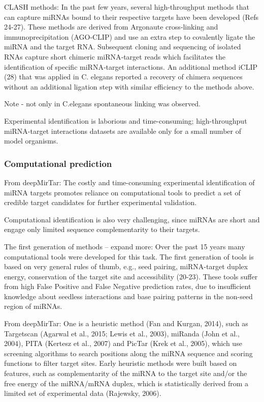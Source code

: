 \documentclass{bmcart}
\begin{document}
CLASH methods:
In the past few years, several high-throughput methods that can capture miRNAs bound to their respective targets have been developed (Refs 24-27). These methods are derived from Argonaute cross‐linking and immunoprecipitation (AGO‐CLIP) and use an extra step to covalently ligate the miRNA and the target RNA. Subsequent cloning and sequencing of isolated RNAs capture short chimeric miRNA‐target reads which facilitates the identification of specific miRNA‐target interactions. An additional method iCLIP (28) that was applied in C. elegans reported a recovery of chimera sequences without an additional ligation step with similar efficiency to the methods above.

Note - not only in C.elegans spontaneous linking was observed.

 Experimental identification is laborious and time-consuming; high-throughput miRNA-target interactions datasets are available only for a small number of model organisms. 

\subsubsection*{Computational prediction}

From deepMirTar: 
The costly and time-consuming experimental identification of
miRNA targets promotes reliance on computational tools to predict
a set of credible target candidates for further experimental validation.

Computational identification is also very challenging, since miRNAs are short and engage only limited sequence complementarity to their targets. 

The first generation of methods -- expand more:
Over the past 15 years many computational tools were developed for this task. The first generation of tools is based on very general rules of thumb, e.g., seed pairing, miRNA-target duplex energy, conservation of the target site and accessibility (20-23). These tools suffer from high False Positive and False Negative prediction rates, due to insufficient knowledge about seedless interactions and base pairing patterns in the non-seed region of miRNAs.

From deepMirTar:
One is a heuristic method (Fan and Kurgan, 2014), such as Targetscan (Agarwal et al., 2015; Lewis et al., 2003), miRanda (John et al., 2004), PITA (Kertesz et al., 2007) and PicTar (Krek et al., 2005), which use screening algorithms to search positions along the miRNA sequence and scoring functions to filter target sites. Early heuristic methods were built based on features, such as complementarity of the miRNA to the target site and/or the free energy of the miRNA/mRNA duplex, which is statistically derived from a limited set of experimental data (Rajewsky, 2006).
\end{document}
